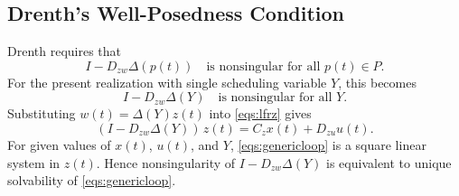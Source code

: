 \documentclass[11pt]{article}
\begin{document}
\subsection{Drenth's Well-Posedness Condition}
Drenth requires that
\begin{equation}
    I - D_{zw}\Delta(p(t))
    \quad \text{is nonsingular for all } p(t)\in P.
    \label{eqs:drenthcriterion}
\end{equation}
For the present realization with single scheduling variable $Y$, this becomes
\begin{equation}
    I - D_{zw}\Delta(Y)
    \quad \text{is nonsingular for all } Y.
    \label{eqs:presentcriterion}
\end{equation}
Substituting $w(t)=\Delta(Y)z(t)$ into \eqref{eqs:lfrz} gives
\begin{equation}
    (I - D_{zw}\Delta(Y))\,z(t) = C_z x(t) + D_{zu}u(t).
    \label{eqs:genericloop}
\end{equation}
For given values of $x(t)$, $u(t)$, and $Y$, \eqref{eqs:genericloop} is a square
linear system in $z(t)$. Hence nonsingularity of $I-D_{zw}\Delta(Y)$ is equivalent
to unique solvability of \eqref{eqs:genericloop}.
\end{document}

